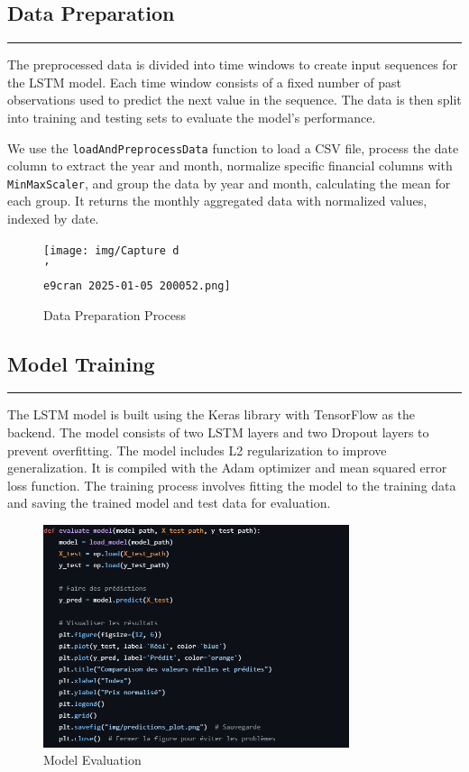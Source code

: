 \documentclass{article}
\begin{document}
\subsection{Data Preparation}
\noindent\rule{\textwidth}{1pt} %
The preprocessed data is divided into time windows to create input sequences for the LSTM model. Each time window consists of a fixed number of past observations used to predict the next value in the sequence. The data is then split into training and testing sets to evaluate the model's performance.

We use the \texttt{loadAndPreprocessData} function to load a CSV file, process the date column to extract the year and month, normalize specific financial columns with \texttt{MinMaxScaler}, and group the data by year and month, calculating the mean for each group. It returns the monthly aggregated data with normalized values, indexed by date.

\begin{figure}[h]
    \centering
    \texttt{[image: img/Capture d\\'\\e9cran 2025-01-05 200052.png]}
    \caption{Data Preparation Process} %
    \label{fig:data-preparation}
\end{figure}

\subsection{Model Training}
\noindent\rule{\textwidth}{1pt} %
The LSTM model is built using the Keras library with TensorFlow as the backend. The model consists of two LSTM layers and two Dropout layers to prevent overfitting. The model includes L2 regularization to improve generalization. It is compiled with the Adam optimizer and mean squared error loss function. The training process involves fitting the model to the training data and saving the trained model and test data for evaluation.

\begin{figure}[h]
    \centering
    \includegraphics[width=0.8\textwidth]{img/evaluation.png}
    \caption{Model Evaluation} %
    \label{fig:evaluation}
\end{figure}
\end{document}
